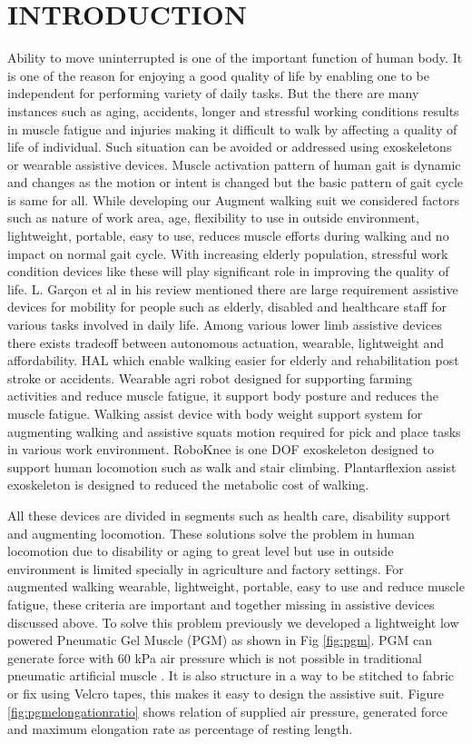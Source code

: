 \documentclass[letterpaper, 10 pt, conference]{ieeeconf}  %
\begin{document}
\section{INTRODUCTION}
Ability to move uninterrupted is one of the important function of human body. It is one of the reason for enjoying a good quality of life by enabling one to be independent for performing variety of daily tasks. But the there are many instances such as aging, accidents, longer and stressful working conditions results in muscle fatigue and injuries making it difficult to walk by affecting a quality of life of individual. Such situation can be avoided or addressed using exoskeletons or wearable assistive devices. Muscle activation pattern of human gait is dynamic and changes as the motion or intent is changed but the basic pattern of gait cycle is same for all. While developing our Augment walking suit we considered factors such as nature of work area, age, flexibility to use in outside environment, lightweight, portable, easy to use, reduces muscle efforts during walking and no impact on normal gait cycle. With increasing elderly population, stressful work condition devices like these will play significant role in improving the quality of life. L. Garçon et al \cite{1} in his review mentioned there are large requirement assistive devices for mobility for people such as elderly, disabled and healthcare staff for various tasks involved in daily life. Among various lower limb assistive devices there exists tradeoff between autonomous actuation, wearable, lightweight and affordability. HAL \cite{2} which enable walking easier for elderly and rehabilitation post stroke or accidents. Wearable agri robot \cite{3} designed for supporting farming activities and reduce muscle fatigue, it support body posture and reduces the muscle fatigue. Walking assist device with body weight support system \cite{4} for augmenting walking and assistive squats motion required for pick and place tasks in various work environment. RoboKnee \cite{5} is one DOF exoskeleton designed to support human locomotion such as walk and stair climbing. Plantarflexion assist exoskeleton \cite{6} is designed to reduced the metabolic cost of walking. 

All these devices are divided in segments such as health care, disability support and augmenting locomotion.  These solutions solve the problem in human locomotion due to disability or aging to great level but use in outside environment is limited specially in agriculture and factory settings. For augmented walking wearable, lightweight, portable, easy to use and reduce muscle fatigue, these criteria are important and together missing in assistive devices discussed above. To solve this problem previously we developed a lightweight low powered Pneumatic Gel Muscle (PGM) \cite{7} as shown in Fig \ref{fig:pgm}. PGM can generate force with 60 kPa air pressure which is not possible in traditional pneumatic artificial muscle \cite{8}. It is also structure in a way to be stitched to fabric or fix using Velcro tapes, this makes it easy to design the assistive suit. Figure \ref{fig:pgmelongationratio} shows relation of supplied air pressure, generated force and maximum elongation rate as percentage of resting length. 
\end{document}
